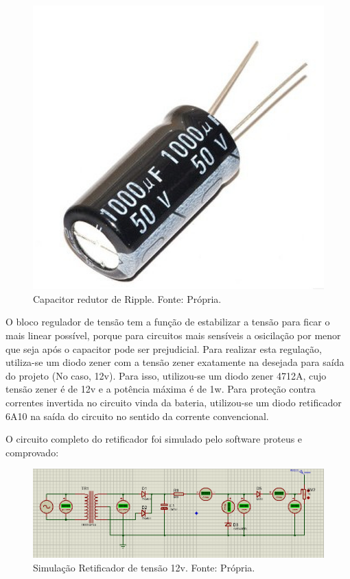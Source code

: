                 \begin{figure}[!htb]
            		\centering
            		\includegraphics[scale= 0.2]{figuras/Capacitor.jpg}
            		\caption{Capacitor redutor de Ripple. Fonte: Própria.}
            		\label{capacitor}
            	\end{figure}
            	
            	O bloco regulador de tensão tem a função de estabilizar a tensão para ficar o 					mais linear possível, porque para circuitos mais sensíveis a osicilação por 					menor que seja após o capacitor  pode ser prejudicial. Para realizar esta 						regulação, utiliza-se um diodo zener com a tensão zener exatamente na desejada 				para saída do projeto (No caso, 12v).  Para isso, utilizou-se um diodo zener 					4712A, cujo tensão zener é de 12v e a potência máxima é de 1w. Para proteção 					contra correntes invertida no circuito vinda da bateria, utilizou-se um diodo 					retificador 6A10 na saída do circuito no sentido da corrente convencional.
		
				O circuito completo do retificador foi simulado pelo software proteus e 						comprovado:
				
                \begin{figure}[!htb]
            		\centering
            		\includegraphics[scale= 0.4]{figuras/Circuito_Retificador.png}
            		\caption{Simulação Retificador de tensão 12v. Fonte: Própria.}
            		\label{retificador-completo}
            	\end{figure}		
            	
